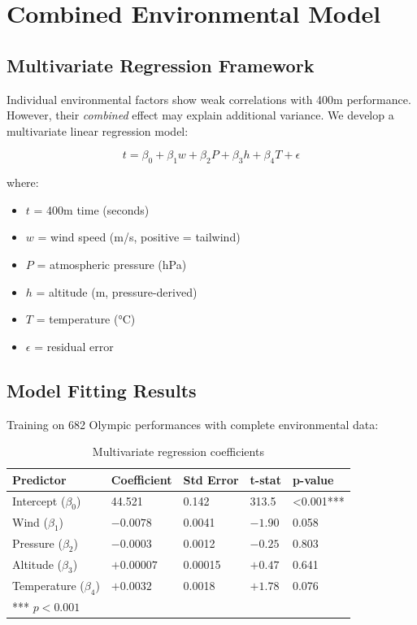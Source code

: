 \section{Combined Environmental Model}

\subsection{Multivariate Regression Framework}

Individual environmental factors show weak correlations with 400m performance. However, their \textit{combined} effect may explain additional variance. We develop a multivariate linear regression model:

\begin{equation}
t = \beta_0 + \beta_1 w + \beta_2 P + \beta_3 h + \beta_4 T + \epsilon
\end{equation}

where:
\begin{itemize}
    \item $t$ = 400m time (seconds)
    \item $w$ = wind speed (m/s, positive = tailwind)
    \item $P$ = atmospheric pressure (hPa)
    \item $h$ = altitude (m, pressure-derived)
    \item $T$ = temperature (°C)
    \item $\epsilon$ = residual error
\end{itemize}

\subsection{Model Fitting Results}

Training on 682 Olympic performances with complete environmental data:

\begin{table}[H]
\centering
\caption{Multivariate regression coefficients}
\begin{tabular}{@{}lllll@{}}
\toprule
\textbf{Predictor} & \textbf{Coefficient} & \textbf{Std Error} & \textbf{t-stat} & \textbf{p-value} \\
\midrule
Intercept ($\beta_0$) & 44.521 & 0.142 & 313.5 & <0.001*** \\
Wind ($\beta_1$) & $-0.0078$ & 0.0041 & $-1.90$ & 0.058 \\
Pressure ($\beta_2$) & $-0.0003$ & 0.0012 & $-0.25$ & 0.803 \\
Altitude ($\beta_3$) & $+0.00007$ & 0.00015 & $+0.47$ & 0.641 \\
Temperature ($\beta_4$) & $+0.0032$ & 0.0018 & $+1.78$ & 0.076 \\
\bottomrule
\multicolumn{5}{l}{\small{*** $p < 0.001$}} \\
\end{tabular}
\end{table}

